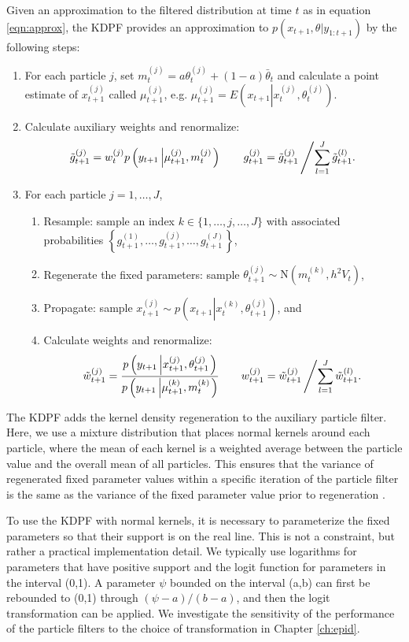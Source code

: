 Given an approximation to the filtered distribution at time $t$ as in equation \eqref{eqn:approx}, the KDPF provides an approximation to $p(x_{t+1},\theta|y_{1:t+1})$ by the following steps:
\begin{enumerate}
\item For each particle $j$, set $m_t^{(j)} = a\theta_t^{(j)} + (1-a)\bar{\theta}_t$ and calculate a point estimate of $x_{t+1}^{(j)}$ called $\mu_{t+1}^{(j)}$, e.g. $\mu_{t+1}^{(j)} = E\left(x_{t+1}\left|x_t^{(j)},\theta_t^{(j)} \right.\right)$.
\item Calculate auxiliary weights and renormalize:
\[ \tilde{g}_{t+1}^{(j)} = w_t^{(j)} p\left(y_{t+1}\left|\mu_{t+1}^{(j)},m_t^{(j)}\right.\right) \qquad g_{t+1}^{(j)} = \tilde{g}_{t+1}^{(j)}\left/ \sum_{l=1}^J \tilde{g}_{t+1}^{(l)}. \right. \]
\item For each particle $j=1,\ldots,J$,
	\begin{enumerate}
    \item Resample: sample an index $k\in\{1,\ldots,j,\ldots,J\}$ with associated probabilities $\left\{g_{t+1}^{(1)},\ldots,g_{t+1}^{(j)},\ldots,g_{t+1}^{(J)}\right\}$,
	\item Regenerate the fixed parameters: sample $\theta_{t+1}^{(j)} \sim \mbox{N}\left(m_t^{(k)}, h^2V_t \right)$,
	\item Propagate: sample $x_{t+1}^{(j)} \sim p\left(x_{t+1}\left|x_t^{(k)},\theta_{t+1}^{(j)}\right.\right)$, and
	\item Calculate weights and renormalize:
	\[ \tilde{w}_{t+1}^{(j)} = \frac{p\left(y_{t+1}\left|x_{t+1}^{(j)},\theta_{t+1}^{(j)}\right.\right)}{p\left(y_{t+1}\left|\mu_{t+1}^{(k)},m_t^{(k)}\right.\right)}
	\qquad
	w_{t+1}^{(j)} = \tilde{w}_{t+1}^{(j)}\left/\sum_{l=1}^J \tilde{w}_{t+1}^{(l)}. \right. \]
	\end{enumerate}
\end{enumerate}
The KDPF adds the kernel density regeneration to the auxiliary particle filter. Here, we use a mixture distribution that places normal kernels around each particle, where the mean of each kernel is a weighted average between the particle value and the overall mean of all particles. This ensures that the variance of regenerated fixed parameter values within a specific iteration of the particle filter is the same as the variance of the fixed parameter value prior to regeneration \citep{Liu:West:comb:2001}.

To use the KDPF with normal kernels, it is necessary to parameterize the fixed parameters so that their support is on the real line. This is not a constraint, but rather a practical implementation detail. We typically use logarithms for parameters that have positive support and the logit function for parameters in the interval (0,1). A parameter $\psi$ bounded on the interval (a,b) can first be rebounded to (0,1) through $(\psi-a)/(b-a)$, and then the logit transformation can be applied. We investigate the sensitivity of the performance of the particle filters to the choice of transformation in Chapter \ref{ch:epid}.

